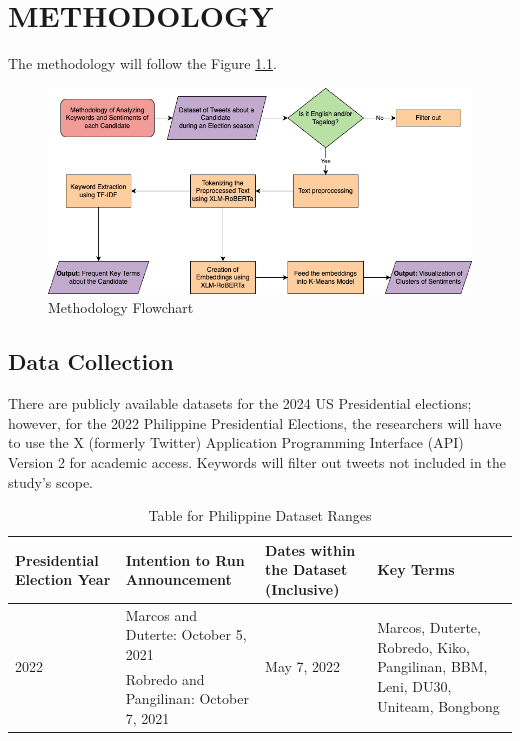 \chapter{METHODOLOGY}
The methodology will follow the Figure \ref{fig:Methodology}.

\begin{figure}[h]
    \centering
    \includegraphics[width=1\textwidth]{Figures/methodology_flowchart.png}
    \caption{Methodology Flowchart}
    \label{fig:Methodology}
\end{figure}

\clearpage

\section{Data Collection}
There are publicly available datasets for the 2024 US Presidential elections; however, for the 2022 Philippine Presidential Elections, the researchers will have to use the X (formerly Twitter) Application Programming Interface (API) Version 2 for academic access. Keywords will filter out tweets not included in the study’s scope.
\newline

\begin{table}[h]
    \centering
    \begin{tabularx}{\textwidth}{X|X|X|X}
        \textbf{Presidential Election Year} & \textbf{Intention to Run Announcement} & \textbf{Dates within the Dataset (Inclusive)} & \textbf{Key Terms}\\
        \hline\hline
        \multirow{2}{*}{2022}& Marcos and Duterte: October 5, 2021 & \multirow{2}{*}{May 7, 2022} & \multirow{2}{4cm}{Marcos, Duterte, Robredo, Kiko, Pangilinan, BBM, Leni, DU30, Uniteam, Bongbong} \\
        & Robredo and Pangilinan: October 7, 2021 & & \\
    \end{tabularx}
    \caption{Table for Philippine Dataset Ranges}
\end{table}

